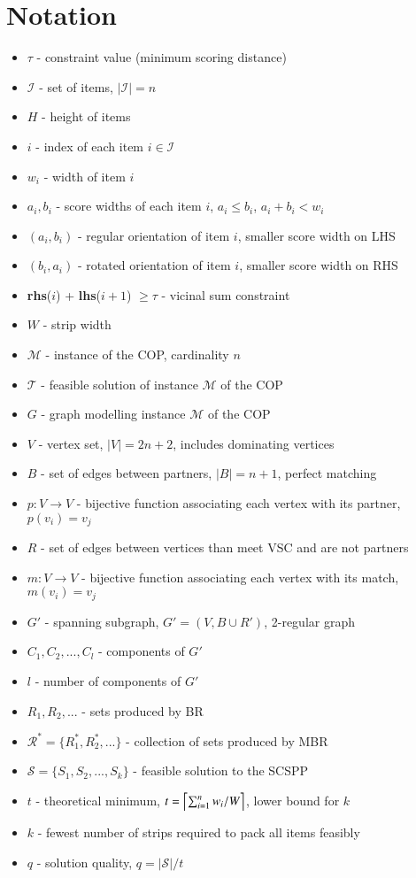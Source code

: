 \documentclass{elsarticle}
\begin{document}
\section{Notation}
\begin{itemize}
	\item $\tau$ - constraint value (minimum scoring distance)
	\item $\mathcal{I}$ - set of items, $|\mathcal{I}| = n$ 
	\item $H$ - height of items
	\item $i$ - index of each item $i \in \mathcal{I}$
	\item $w_i$ - width of item $i$
	\item $a_i, b_i$ - score widths of each item $i$, $a_i \leq b_i$, $a_i + b_i < w_i$
	\item $(a_i, b_i)$ - regular orientation of item $i$, smaller score width on LHS
	\item $(b_i, a_i)$ - rotated orientation of item $i$, smaller score width on RHS
	\item \textbf{rhs}($i$) + \textbf{lhs}($i+1$) $\geq \tau$ - vicinal sum constraint
	\item $W$ - strip width
	\item $\mathcal{M}$ - instance of the COP, cardinality $n$
	\item $\mathcal{T}$ - feasible solution of instance $\mathcal{M}$ of the COP
	\item $G$ - graph modelling instance $\mathcal{M}$ of the COP
	\item $V$ - vertex set, $|V| = 2n + 2$, includes dominating vertices
	\item $B$ - set of edges between partners, $|B| = n+1$, perfect matching
	\item $p : V \to V$ - bijective function associating each vertex with its partner, $p(v_i) = v_j$
	\item $R$ - set of edges between vertices than meet VSC and are not partners
	\item $m : V \to V$ - bijective function associating each vertex with its match, $m(v_i) = v_j$
	\item $G'$ - spanning subgraph, $G' = (V, B \cup R')$, 2-regular graph
	\item $C_1, C_2,..., C_l$ - components of $G'$
	\item $l$ - number of components of $G'$
	\item $R_1, R_2,...$ - sets produced by BR
	\item $\mathcal{R}^* = \{R_{1}^{*}, R_{2}^{*},...\}$ - collection of sets produced by MBR
	\item $\mathcal{S} = \{S_1, S_2,...,S_k\}$ - feasible solution to the SCSPP
	\item $t$ - theoretical minimum, $t = \ceil*{\sum_{i=1}^{n}w_i / W}$, lower bound for $k$
	\item $k$ - fewest number of strips required to pack all items feasibly
	\item $q$ - solution quality, $q = |\mathcal{S}| / t$
\end{itemize}
\end{document}
